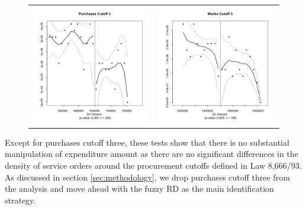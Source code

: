 \documentclass[11pt]{article}
\begin{document}
\begin{figure}[!htbp]
\begin{tabular}{cc}
  \includegraphics[scale=.41]{purchasesmanipulation3} & \includegraphics[scale=.41]{worksmanipulation3} \\
  \end{tabular}
\end{figure}

Except for purchases cutoff three, these tests show that there is no substantial manipulation of expenditure amount as there are no significant differences in the density of service orders around the procurement cutoffs defined in Law 8,666/93. As discussed in section \ref{sec:methodology}, we drop purchases cutoff three from the analysis and move ahead with the fuzzy RD as the main identification strategy.
\end{document}
